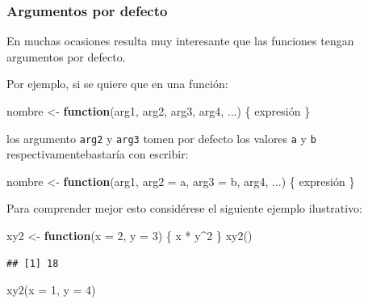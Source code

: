 \documentclass[
]{book}
\newenvironment{Shaded}{\begin{snugshade}}{\end{snugshade}}
\newcommand{\AttributeTok}[1]{\textcolor[rgb]{0.77,0.63,0.00}{#1}}
\newcommand{\ControlFlowTok}[1]{\textcolor[rgb]{0.13,0.29,0.53}{\textbf{#1}}}
\newcommand{\DecValTok}[1]{\textcolor[rgb]{0.00,0.00,0.81}{#1}}
\newcommand{\FunctionTok}[1]{\textcolor[rgb]{0.00,0.00,0.00}{#1}}
\newcommand{\NormalTok}[1]{#1}
\newcommand{\OtherTok}[1]{\textcolor[rgb]{0.56,0.35,0.01}{#1}}
\newcommand{\SpecialCharTok}[1]{\textcolor[rgb]{0.00,0.00,0.00}{#1}}
\theoremstyle{break}
\theoremstyle{nonumberplain}
\begin{document}
\hypertarget{argumentos-por-defecto}{%
\subsubsection{Argumentos por defecto}\label{argumentos-por-defecto}}

En muchas ocasiones
resulta muy interesante que las funciones tengan argumentos por defecto.

Por ejemplo, si se quiere que en una función:

\begin{Shaded}
\begin{Highlighting}[]
\NormalTok{nombre }\OtherTok{\textless{}{-}} \ControlFlowTok{function}\NormalTok{(arg1, arg2, arg3, arg4, ...) \{ expresión \}}
\end{Highlighting}
\end{Shaded}

los argumento \texttt{arg2} y \texttt{arg3} tomen por defecto los valores \texttt{a} y \texttt{b}
respectivamentebastaría con escribir:

\begin{Shaded}
\begin{Highlighting}[]
\NormalTok{nombre }\OtherTok{\textless{}{-}} \ControlFlowTok{function}\NormalTok{(arg1, }\AttributeTok{arg2 =}\NormalTok{ a, }\AttributeTok{arg3 =}\NormalTok{ b, arg4, ...) \{ expresión \}}
\end{Highlighting}
\end{Shaded}

Para comprender mejor esto considérese el siguiente ejemplo ilustrativo:

\begin{Shaded}
\begin{Highlighting}[]
\NormalTok{xy2 }\OtherTok{\textless{}{-}} \ControlFlowTok{function}\NormalTok{(}\AttributeTok{x =} \DecValTok{2}\NormalTok{, }\AttributeTok{y =} \DecValTok{3}\NormalTok{) \{ x }\SpecialCharTok{*}\NormalTok{ y}\SpecialCharTok{\^{}}\DecValTok{2}\NormalTok{ \}}
\FunctionTok{xy2}\NormalTok{()}
\end{Highlighting}
\end{Shaded}

\begin{verbatim}
## [1] 18
\end{verbatim}

\begin{Shaded}
\begin{Highlighting}[]
\FunctionTok{xy2}\NormalTok{(}\AttributeTok{x =} \DecValTok{1}\NormalTok{, }\AttributeTok{y =} \DecValTok{4}\NormalTok{)}
\end{Highlighting}
\end{Shaded}
\end{document}
